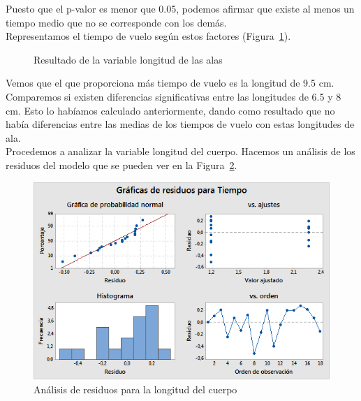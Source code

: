 \documentclass[12pt,a4paper,twoside,openright,titlepage,final]{article}
\begin{document}
Puesto que el p-valor es menor que 0.05, podemos afirmar que existe al menos un tiempo medio que no se corresponde con los demás.\\

Representamos el tiempo de vuelo según estos factores (Figura~\ref{fig:resultado_largo_alas}).\\

\begin{figure}[htbp!]
	\centering
	\caption{Resultado de la variable longitud de las alas} \label{fig:resultado_largo_alas}
\end{figure}

Vemos que el que proporciona más tiempo de vuelo es la longitud de 9.5 cm. Comparemos si existen diferencias significativas entre las longitudes de 6.5 y 8 cm. Esto lo habíamos calculado anteriormente, dando como resultado que no había diferencias entre las medias de los tiempos de vuelo con estas longitudes de ala.\\

Procedemos a analizar la variable longitud del cuerpo. Hacemos un análisis de los residuos del modelo que se pueden ver en la Figura~\ref{fig:residuos_largo_cuerpo}. 

\begin{figure}[htbp!]
	\centering
	\includegraphics[width=0.7\linewidth]{imagenes/Graficas_de_residuos_para_Tiempo_ANOVA_(largo_cuerpo)}
	\caption{Análisis de residuos para la longitud del cuerpo}
	\label{fig:residuos_largo_cuerpo}
\end{figure}
\end{document}
